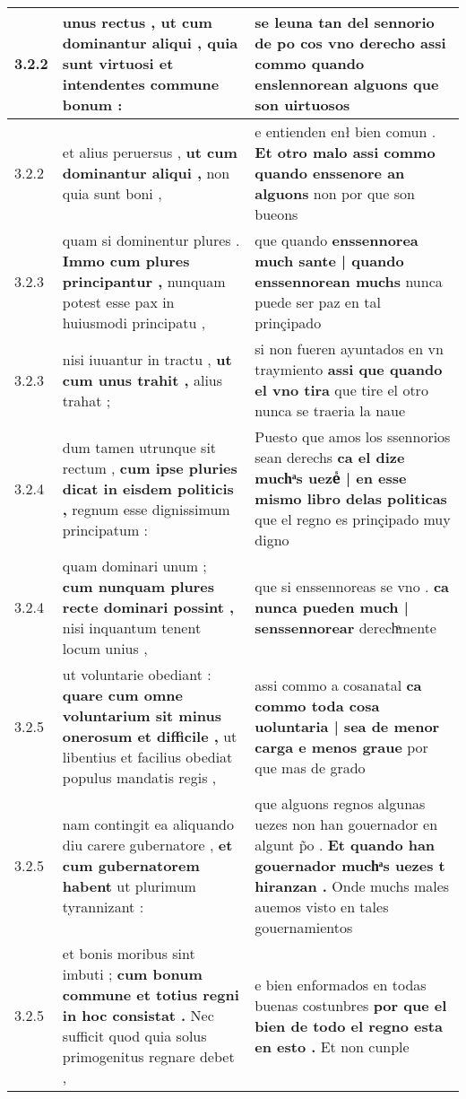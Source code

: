 \begin{tabular}{|p{1cm}|p{6.5cm}|p{6.5cm}|}
3.2.2 & unus rectus , \textbf{ ut cum dominantur aliqui , } quia sunt virtuosi et intendentes commune bonum : & se leuna tan del sennorio de po cos vno derecho \textbf{ assi commo quando enslennorean alguons } que son uirtuosos \\\hline
3.2.2 & et alius peruersus , \textbf{ ut cum dominantur aliqui , } non quia sunt boni , & e entienden enł bien comun . \textbf{ Et otro malo assi commo quando enssenore an alguons } non por que son bueons \\\hline
3.2.3 & quam si dominentur plures . \textbf{ Immo cum plures principantur , } nunquam potest esse pax in huiusmodi principatu , & que quando \textbf{ enssennorea much sante | quando enssennorean muchs } nunca puede ser paz en tal prinçipado \\\hline
3.2.3 & nisi iuuantur in tractu , \textbf{ ut cum unus trahit , } alius trahat ; & si non fueren ayuntados en vn traymiento \textbf{ assi que quando el vno tira } que tire el otro nunca se traeria la naue \\\hline
3.2.4 & dum tamen utrunque sit rectum , \textbf{ cum ipse pluries dicat in eisdem politicis , } regnum esse dignissimum principatum : & Puesto que amos los ssennorios sean derechs \textbf{ ca el dize muchͣs uezeᷤ | en esse mismo libro delas politicas } que el regno es prinçipado muy digno \\\hline
3.2.4 & quam dominari unum ; \textbf{ cum nunquam plures recte dominari possint , } nisi inquantum tenent locum unius , & que si enssennoreas se vno . \textbf{ ca nunca pueden much | senssennorear } derechͣmente \\\hline
3.2.5 & ut voluntarie obediant : \textbf{ quare cum omne voluntarium sit minus onerosum et difficile , } ut libentius et facilius obediat populus mandatis regis , & assi commo a cosanatal \textbf{ ca commo toda cosa uoluntaria | sea de menor carga e menos graue } por que mas de grado \\\hline
3.2.5 & nam contingit ea aliquando diu carere gubernatore , \textbf{ et cum gubernatorem habent } ut plurimum tyrannizant : & que alguons regnos algunas uezes non han gouernador en algunt p̃o . \textbf{ Et quando han gouernador muchͣs uezes t hiranzan . } Onde muchs males auemos visto en tales gouernamientos \\\hline
3.2.5 & et bonis moribus sint imbuti ; \textbf{ cum bonum commune et totius regni in hoc consistat . } Nec sufficit quod quia solus primogenitus regnare debet , & e bien enformados en todas buenas costunbres \textbf{ por que el bien de todo el regno esta en esto . } Et non cunple \\\hline

\end{tabular}
